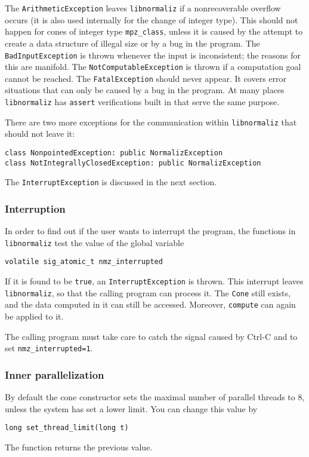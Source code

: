 \begin{small}
The \verb|ArithmeticException| leaves \verb|libnormaliz| if a nonrecoverable overflow occurs (it is also used internally for the change of integer type). This should not happen for cones of integer type \verb|mpz_class|, unless it is caused by the attempt to create a data structure of illegal size or by a bug in the program. The \verb|BadInputException| is thrown whenever the input is inconsistent; the reasons for this are manifold. The \verb|NotComputableException| is thrown if a computation goal cannot be reached. The \verb|FatalException| should never appear. It covers error situations that can only be caused by a bug in the program. At many places \verb|libnormaliz| has \verb|assert| verifications built in that serve the same purpose.

There are two more exceptions for the communication within \verb|libnormaliz| that should not leave it:
\begin{Verbatim}
class NonpointedException: public NormalizException 
class NotIntegrallyClosedException: public NormalizException
\end{Verbatim}

The \verb|InterruptException| is discussed in the next section.

\subsubsection{Interruption}

In order to find out if the user wants to interrupt the program, the functions in \verb|libnormaliz| test the value of the global variable
\begin{Verbatim}
volatile sig_atomic_t nmz_interrupted
\end{Verbatim}
If it is found to be \verb|true|, an \verb|InterruptException| is thrown. This interrupt leaves \verb|libnormaliz|, so that the calling program can process it. The \verb|Cone| still exists, and the data computed in it can still be accessed. Moreover, \verb|compute| can again be applied to it.

The calling program must take care to catch the signal caused by Ctrl-C and to set \verb|nmz_interrupted=1|.

\subsubsection{Inner parallelization}

By default the cone constructor sets the maximal number of parallel threads to $8$, unless the system has set a lower limit. You can change this value by
\begin{Verbatim}
long set_thread_limit(long t)
\end{Verbatim}
The function returns the previous value.


\end{small}
